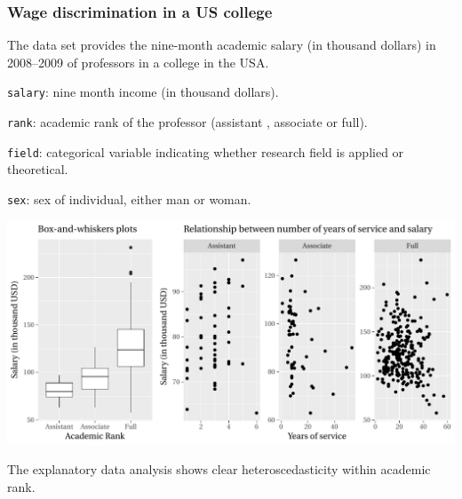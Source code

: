 \documentclass{beamer}
\begin{document}
\begin{frame}
\frametitle{Wage discrimination in a US college}
The  data set provides the nine-month academic salary
(in thousand dollars) in 2008–2009 of professors in a college in the USA.
\bi
\item \texttt{salary}: nine month income (in thousand dollars).
\item \texttt{rank}: academic rank of the professor (assistant , associate or full).
\item \texttt{field}: categorical variable indicating whether research field is applied or theoretical.
\item \texttt{sex}: sex of individual, either man or woman.
\ei
\end{frame}
\begin{frame}
 \begin{center}
\includegraphics[width = 0.95\linewidth]{img/c5/06-correlated-salary_EDA}  
 \end{center}
The explanatory data analysis shows clear heteroscedasticity within academic rank.
\end{frame}
\end{document}
